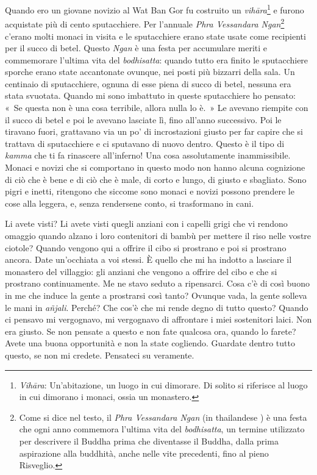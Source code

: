Quando ero un giovane novizio al Wat Ban Gor fu costruito un
\emph{vihāra}\footnote{\emph{Vihāra}: Un'abitazione, un luogo in cui
  dimorare. Di solito si riferisce al luogo in cui dimorano i monaci,
  ossia un monastero.} e furono acquistate più di cento sputacchiere.
Per l'annuale \emph{Phra Vessandara Ngan}\footnote{Come si dice nel
  testo, il \emph{Phra Vessandara Ngan} (in thailandese ) è
  una festa che ogni anno commemora l'ultima vita del \emph{bodhisatta},
  un termine utilizzato per descrivere il Buddha prima che diventasse il
  Buddha, dalla prima aspirazione alla buddhità, anche nelle vite
  precedenti, fino al pieno Risveglio.} c'erano molti monaci in visita e
le sputacchiere erano state usate come recipienti per il succo di betel.
Questo \emph{Ngan} è una festa per accumulare meriti e commemorare
l'ultima vita del \emph{bodhisatta}: quando tutto era finito le
sputacchiere sporche erano state accantonate ovunque, nei posti più
bizzarri della sala. Un centinaio di sputacchiere, ognuna di esse piena
di succo di betel, nessuna era stata svuotata. Quando mi sono imbattuto
in queste sputacchiere ho pensato: «~Se questa non è una cosa terribile,
allora nulla lo è.~» Le avevano riempite con il succo di betel e poi le
avevano lasciate lì, fino all'anno successivo. Poi le tiravano fuori,
grattavano via un po' di incrostazioni giusto per far capire che si
trattava di sputacchiere e ci sputavano di nuovo dentro. Questo è il
tipo di \emph{kamma} che ti fa rinascere all'inferno! Una cosa
assolutamente inammissibile. Monaci e novizi che si comportano in questo
modo non hanno alcuna cognizione di ciò che è bene e di ciò che è male,
di corto e lungo, di giusto e sbagliato. Sono pigri e inetti, ritengono
che siccome sono monaci e novizi possono prendere le cose alla leggera,
e, senza rendersene conto, si trasformano in cani.

Li avete visti? Li avete visti quegli anziani con i capelli grigi che vi
rendono omaggio quando alzano i loro contenitori di bambù per mettere il
riso nelle vostre ciotole? Quando vengono qui a offrire il cibo si
prostrano e poi si prostrano ancora. Date un'occhiata a voi stessi. È
quello che mi ha indotto a lasciare il monastero del villaggio: gli
anziani che vengono a offrire del cibo e che si prostrano continuamente.
Me ne stavo seduto a ripensarci. Cosa c'è di così buono in me che induce
la gente a prostrarsi così tanto? Ovunque vada, la gente solleva le mani
in \emph{añjali}. Perché? Che cos'è che mi rende degno di tutto questo?
Quando ci pensavo mi vergognavo, mi vergognavo di affrontare i miei
sostenitori laici. Non era giusto. Se non pensate a questo e non fate
qualcosa ora, quando lo farete? Avete una buona opportunità e non la
state cogliendo. Guardate dentro tutto questo, se non mi credete.
Pensateci su veramente.

